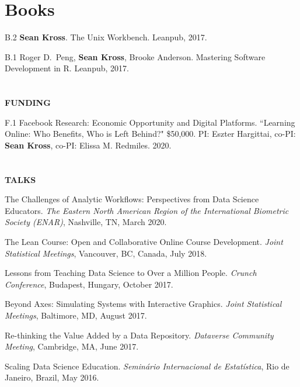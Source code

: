 \vspace{0.1in}

\section{Books}

\begin{bibenum}

\item[B.2] \textbf{Sean Kross}. The Unix Workbench. Leanpub, 2017.

\item[B.1] Roger D.\ Peng, \textbf{Sean Kross}, Brooke Anderson. Mastering 
Software Development in R. Leanpub, 2017.

\end{bibenum}


\section{} \vspace{0.2in} \textbf{FUNDING} \vspace{0.05in}

\begin{bibenum}

\item[F.1] Facebook Research: Economic Opportunity and Digital Platforms. ``Learning Online: Who Benefits, Who is Left Behind?" \$50,000. PI: Eszter Hargittai, co-PI: \textbf{Sean Kross}, co-PI: Elissa M. Redmiles. 2020.

\end{bibenum}

\section{} \textbf{TALKS} \vspace{0.05in}

\begin{innerlist}
\item The Challenges of Analytic Workflows: Perspectives from Data Science Educators. \textit{The Eastern North American Region of the International Biometric Society (ENAR)}, Nashville, TN, March 2020.
\item The Lean Course: Open and Collaborative Online Course Development. \textit{Joint Statistical Meetings}, Vancouver, BC, Canada, July 2018.
\item Lessons from Teaching Data Science to Over a Million People. \textit{Crunch Conference}, Budapest, Hungary, October 2017.
\item Beyond Axes: Simulating Systems with Interactive Graphics. \textit{Joint Statistical Meetings}, Baltimore, MD, August 2017.
\item Re-thinking the Value Added by a Data Repository. \textit{Dataverse Community Meeting}, Cambridge, MA, June 2017.
\item Scaling Data Science Education. \textit{Seminário Internacional de Estatística}, Rio de Janeiro, Brazil, May 2016.
\end{innerlist}

